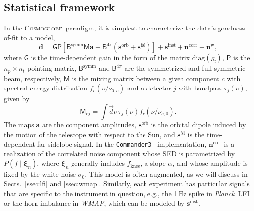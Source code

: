 \documentclass[twocolumn]{../../common/aa}
\def\WMAP{\emph{WMAP}}
\def\Planck{\emph{Planck}}
\def\commanderthree{\texttt{Commander3}}
\renewcommand{\d}[0]{\vec{d}}
\newcommand{\cosmoglobe}{\textsc{Cosmoglobe}}
\begin{document}
\subsection{Statistical framework}


In the \cosmoglobe\ paradigm, it is simplest to characterize the data's goodness-of-fit to a model,
\begin{equation}
	\label{eq:model}
	\boldsymbol d =\mathsf G\mathsf P[\mathsf B^\mathrm{symm}\mathsf M\boldsymbol a+\mathsf B^\mathrm{4\pi}(\boldsymbol s^\mathrm{orb}
	+\boldsymbol s^\mathrm{fsl})] + \boldsymbol s^\mathrm{inst}+\boldsymbol n^\mathrm{corr}+\boldsymbol n^\mathrm w,
\end{equation}
where $\mathsf G$ is the time-dependent gain in the form of the matrix $\mathrm{diag}(g_t)$, $\mathsf P$ is the $n_p\times n_t$ pointing matrix, 
$\mathsf B^\mathrm{symm}$ and $\mathsf B^{4\pi}$ are the symmetrized and full symmetric beam, respectively, $\mathsf M$ is the mixing matrix between a given component $c$ with spectral energy distribution $f_c(\nu/\nu_{0,c})$ and a detector $j$ with bandpass $\tau_j(\nu)$, given by
\begin{equation}
	\mathsf M_{cj}=\int\d\nu\,\tau_j(\nu)f_c(\nu/\nu_{c,0}).
\end{equation}
The maps $\boldsymbol a$ are the component amplitudes, $\boldsymbol s^\mathrm{orb}$ is the orbital dipole induced by the motion of the telescope with respect to the Sun, and $\boldsymbol s^\mathrm{fsl}$ is the time-dependent far sidelobe signal. In the \commanderthree\ \citep{bp03} implementation, $\boldsymbol n^\mathrm{corr}$ is a realization of the correlated noise component whose SED is parametrized by $P(f\mid\boldsymbol\xi_n)$, where $\boldsymbol\xi_n$ generally includes $f_\mathrm{knee}$, a slope $\alpha$, and whose amplitude is fixed by the white noise $\sigma_0$. This model is often augmented, as we will discuss in Sects.~\ref{ssec:lfi} and \ref{ssec:wmap}. Similarly, each experiment has particular signals that are specific to the instrument in question, e.g., the 1\,Hz spike in \Planck\ LFI or the horn imbalance in \WMAP, which can be modeled by $\boldsymbol s^\mathrm{inst}$.
\end{document}
